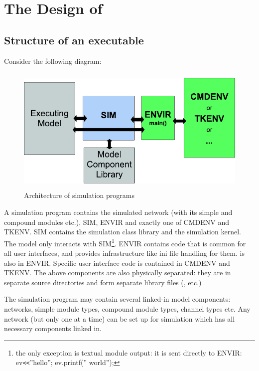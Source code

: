 \chapter{The Design of {\opp}}
\label{cha:the-design-of-omnet}

\section{Structure of an {\opp} executable}

Consider the following diagram:

\begin{figure}[htbp]
  \begin{center}
    \includegraphics[width=4.757in, height=2.412in]{figures/usmanFig18}
    \caption{Architecture of {\opp} simulation programs}
  \end{center}
\end{figure}

A simulation program contains the simulated network (with its
simple and compound
modules etc.), SIM, ENVIR and exactly one of CMDENV and TKENV. SIM
contains the simulation class library
and the simulation kernel. The model only interacts with
SIM\footnote{the only exception is textual module output: it is sent
  directly to ENVIR: ev\texttt{<}\texttt{<}''hello''; ev.printf(''
  world'');}. ENVIR contains code that is common for all user
interfaces, and provides infrastructure like ini file handling for
them.  is also in ENVIR. Specific user interface code is
contained in CMDENV and TKENV. The above components are also
physically separated: they are in separate source directories and form
separate library files (,  etc.)

The simulation program may contain several linked-in model
components: networks,
simple module types,
compound module types, channel types etc. Any
network (but only one at a time) can be set up for simulation which
has all necessary components linked in.





